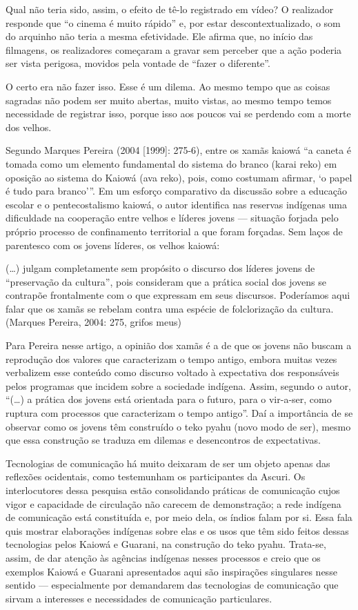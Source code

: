Qual não teria sido, assim, o efeito de tê-lo registrado em vídeo? O
realizador responde que ``o cinema é muito rápido'' e, por estar
descontextualizado, o som do arquinho não teria a mesma efetividade.
Ele afirma que, no início das filmagens, os realizadores começaram a
gravar sem perceber que a ação poderia ser vista perigosa, movidos pela
vontade de ``fazer o diferente''.

O certo era não fazer isso. Esse é um dilema. Ao mesmo tempo que as
coisas sagradas não podem ser muito abertas, muito vistas, ao mesmo
tempo temos necessidade de registrar isso, porque isso aos poucos vai
se perdendo com a morte dos velhos.

Segundo Marques Pereira (2004 [1999]: 275-6), entre os xamãs kaiowá ``a
caneta é tomada como um elemento fundamental do sistema do branco
(karai reko) em oposição ao sistema do Kaiowá (ava reko), pois, como
costumam afirmar, ‘o papel é tudo para branco’''. Em um esforço
comparativo da discussão sobre a educação escolar e o pentecostalismo
kaiowá, o autor identifica nas reservas indígenas uma dificuldade na
cooperação entre velhos e líderes jovens --- situação forjada pelo
próprio processo de confinamento territorial a que foram forçadas. Sem
laços de parentesco com os jovens líderes, os velhos kaiowá:

(\ldots{}) julgam completamente sem propósito o discurso dos líderes jovens
de ``preservação da cultura'', pois
consideram que a prática social dos jovens se contrapõe frontalmente
com o que expressam em seus discursos. Poderíamos aqui falar que os
xamãs se rebelam contra uma espécie de folclorização da cultura.
(Marques Pereira, 2004:  275, grifos meus)

Para Pereira nesse artigo, a opinião dos xamãs é a de que os jovens não
buscam a reprodução dos valores que caracterizam o tempo antigo, embora
muitas vezes verbalizem esse conteúdo como discurso voltado à
expectativa dos responsáveis pelos programas que incidem sobre a
sociedade indígena. Assim, segundo o autor, ``(\ldots{}) a prática dos jovens
está orientada para o futuro, para o vir-a-ser, como ruptura com
processos que caracterizam o tempo antigo''. Daí a importância de se
observar como os jovens têm construído o teko pyahu (novo modo de ser),
mesmo que essa construção se traduza em dilemas e desencontros de
expectativas.

Tecnologias de comunicação há muito deixaram de ser um objeto apenas das
reflexões ocidentais, como testemunham os participantes da Ascuri. Os
interlocutores dessa pesquisa estão consolidando práticas de
comunicação cujos vigor e capacidade de circulação não carecem de
demonstração; a rede indígena de comunicação está constituída e, por
meio dela, os índios falam por si. Essa fala quis mostrar elaborações
indígenas sobre elas e os usos que têm sido feitos dessas tecnologias
pelos Kaiowá e Guarani, na construção do teko pyahu. Trata-se, assim,
de dar atenção às agências indígenas nesses processos e creio que os
exemplos Kaiowá e Guarani apresentados aqui são inspirações singulares
nesse sentido --- especialmente por demandarem das tecnologias de
comunicação que sirvam a interesses e necessidades de comunicação
particulares. 

